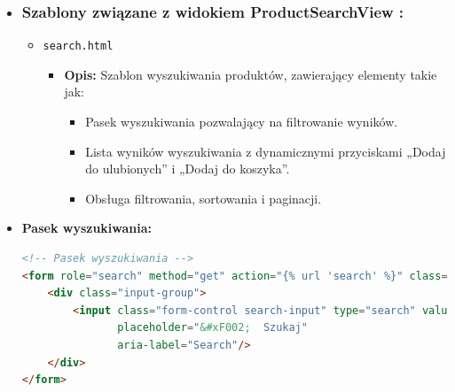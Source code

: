 \documentclass[12pt,a4paper,oneside]{article}
\theoremstyle{definition}
\numberwithin{equation}{section}
\begin{document}
\begin{itemize}
    \item \subsubsection{Szablony związane z widokiem ProductSearchView :}
        \begin{itemize}
            \item \texttt{search.html}
                \begin{itemize}
                    \item \textbf{Opis:} Szablon wyszukiwania produktów, zawierający elementy takie jak:
                    \begin{itemize}
                        \item Pasek wyszukiwania pozwalający na filtrowanie wyników.
                        \item Lista wyników wyszukiwania z dynamicznymi przyciskami „Dodaj do ulubionych” i „Dodaj do koszyka”.
                        \item Obsługa filtrowania, sortowania i paginacji.
                    \end{itemize}
                \end{itemize}
        \end{itemize}

    \item \textbf{Pasek wyszukiwania:}
        \begin{lstlisting}[language=HTML, caption=Pasek wyszukiwania]
<!-- Pasek wyszukiwania -->
<form role="search" method="get" action="{% url 'search' %}" class="searchBar">
    <div class="input-group">
        <input class="form-control search-input" type="search" value="{{ request.GET.search_value }}" name="search_value"
               placeholder="&#xF002;  Szukaj"
               aria-label="Search"/>
    </div>
</form>
        \end{lstlisting}
\end{itemize}
\end{document}

